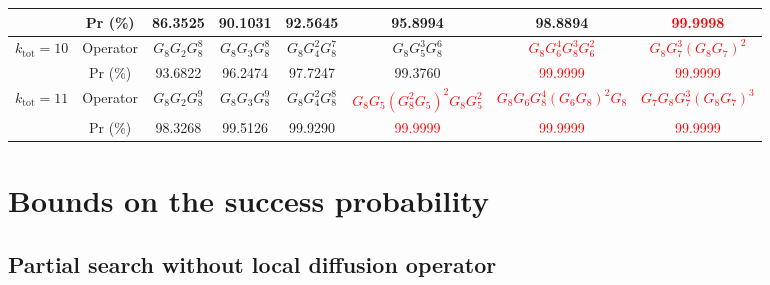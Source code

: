 \documentclass[a4paper,10pt]{article}
\numberwithin{equation}{section}
\begin{document}
\begin{table}[t]
\begin{tabular}{c|c|c|c|c|c|c|c}
         & Pr (\%) & 86.3525 & 90.1031 & 92.5645 & 95.8994 & 98.8894 & \textcolor{red}{99.9998} \\\hline 
         \multirow{2}{*}{$k_\text{tot} = 10$} & Operator & $G_8G_2G^8_8$ & $G_8G_3G^8_8$ & $G_8G_4^2G^7_8$ & $G_8G_5^3G^6_8$ & \textcolor{red}{$G_8G_6^4G^3_8G_6^2$} & \textcolor{red}{$G_8G_7^3(G_8G_7)^2$} \\
         & Pr (\%) & 93.6822 & 96.2474 & 97.7247 & 99.3760 & \textcolor{red}{99.9999} & \textcolor{red}{99.9999} \\\hline 
         \multirow{2}{*}{$k_\text{tot} = 11$} & Operator & $G_8G_2G^9_8$ & $G_8G_3G^9_8$ & $G_8G_4^2G^8_8$ & \textcolor{red}{$G_8G_5(G^2_8G_5)^2G_8G^2_5$} & \textcolor{red}{$G_8G_6G_8^4(G_6G_8)^2G_8$} & \textcolor{red}{$G_7G_8G_7^3(G_8G_7)^3$} \\
         & Pr (\%) & 98.3268 & 99.5126 & 99.9290 & \textcolor{red}{99.9999} & \textcolor{red}{99.9999} & \textcolor{red}{99.9999} \\
    \hline\hline
    \end{tabular}
    \label{tab:n=8}
\end{table}


\section{Bounds on the success probability}

\subsection{Partial search without local diffusion operator}
\end{document}
